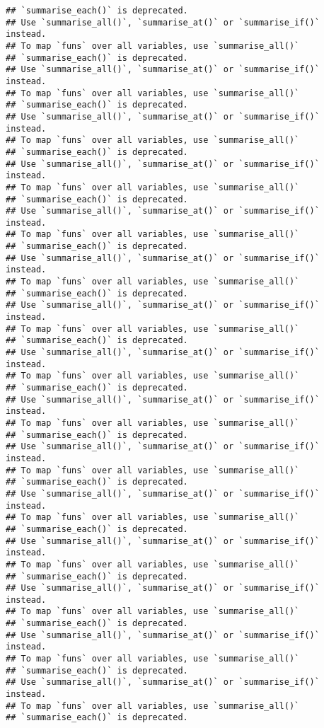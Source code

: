 \documentclass[]{article}
\begin{document}
\begin{verbatim}
## `summarise_each()` is deprecated.
## Use `summarise_all()`, `summarise_at()` or `summarise_if()` instead.
## To map `funs` over all variables, use `summarise_all()`
## `summarise_each()` is deprecated.
## Use `summarise_all()`, `summarise_at()` or `summarise_if()` instead.
## To map `funs` over all variables, use `summarise_all()`
## `summarise_each()` is deprecated.
## Use `summarise_all()`, `summarise_at()` or `summarise_if()` instead.
## To map `funs` over all variables, use `summarise_all()`
## `summarise_each()` is deprecated.
## Use `summarise_all()`, `summarise_at()` or `summarise_if()` instead.
## To map `funs` over all variables, use `summarise_all()`
## `summarise_each()` is deprecated.
## Use `summarise_all()`, `summarise_at()` or `summarise_if()` instead.
## To map `funs` over all variables, use `summarise_all()`
## `summarise_each()` is deprecated.
## Use `summarise_all()`, `summarise_at()` or `summarise_if()` instead.
## To map `funs` over all variables, use `summarise_all()`
## `summarise_each()` is deprecated.
## Use `summarise_all()`, `summarise_at()` or `summarise_if()` instead.
## To map `funs` over all variables, use `summarise_all()`
## `summarise_each()` is deprecated.
## Use `summarise_all()`, `summarise_at()` or `summarise_if()` instead.
## To map `funs` over all variables, use `summarise_all()`
## `summarise_each()` is deprecated.
## Use `summarise_all()`, `summarise_at()` or `summarise_if()` instead.
## To map `funs` over all variables, use `summarise_all()`
## `summarise_each()` is deprecated.
## Use `summarise_all()`, `summarise_at()` or `summarise_if()` instead.
## To map `funs` over all variables, use `summarise_all()`
## `summarise_each()` is deprecated.
## Use `summarise_all()`, `summarise_at()` or `summarise_if()` instead.
## To map `funs` over all variables, use `summarise_all()`
## `summarise_each()` is deprecated.
## Use `summarise_all()`, `summarise_at()` or `summarise_if()` instead.
## To map `funs` over all variables, use `summarise_all()`
## `summarise_each()` is deprecated.
## Use `summarise_all()`, `summarise_at()` or `summarise_if()` instead.
## To map `funs` over all variables, use `summarise_all()`
## `summarise_each()` is deprecated.
## Use `summarise_all()`, `summarise_at()` or `summarise_if()` instead.
## To map `funs` over all variables, use `summarise_all()`
## `summarise_each()` is deprecated.
## Use `summarise_all()`, `summarise_at()` or `summarise_if()` instead.
## To map `funs` over all variables, use `summarise_all()`
## `summarise_each()` is deprecated.

\end{verbatim}
\end{document}
